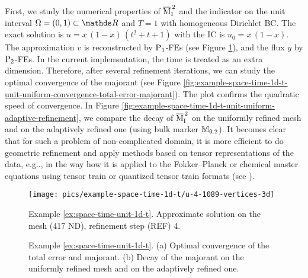 \begin{example}
\label{ex:space-time-unit-1d-t}

First, we study the numerical properties of $\overline{\mathrm M}^{\,2}_{\mathrm{I}}$ and the indicator on the unit 
interval $\Omega = (0, 1) \subset \Real$ and $T = 1$ with homogeneous Dirichlet BC.
The exact solution is $u = x\,(1 - x)\,(t^2 + t + 1)$ with the IC is
$u_0 = x\,(1 - x)$. The approximation $v$ is reconstructed by 
${\rm P}_{1}$-FEs (see Figure \ref{fig:example-space-time-shape-approx}), 
and the flux $y$ by ${\rm P}_{2}$-FEs. In the current implementation, the time is 
treated as an extra dimension. Therefore, after several refinement iterations, we 
can study the optimal convergence of the majorant 
(see Figure 
\ref{fig:example-space-time-1d-t-unit-uniform-convergence-total-error-majorant}). 
The plot confirms the quadratic speed of convergence. In Figure
\ref{fig:example-space-time-1d-t-unit-uniform-adaptive-refinement},
we compare the decay of $\overline{\mathrm M}^{\,2}_{\mathrm{I}}$ on the uniformly refined mesh and on the adaptively 
refined one (using bulk marker ${\mathbb M}_{0.2}$). It becomes clear that for such a 
problem 
of non-complicated domain, it is more efficient to do geometric refinement and 
apply methods based on tensor representations of the data, e.g.., in the way how it is 
applied to the Fokker--Planck or chemical master equations using tensor train or 
quantized tensor train formats 
(see \cite{DolgovKhoromskij2015, DolgovKhoromskijOseledets2012}).
\begin{figure}[!ht]
	\centering
	\texttt{[image: pics/example-space-time-1d-t/u-4-1089-vertices-3d]}
	\caption{Example \ref{ex:space-time-unit-1d-t}. 
	Approximate solution on the mesh (417 ND), refinement step (REF) 4.}	
	\label{fig:example-space-time-shape-approx}	
\end{figure}

\begin{figure}[!ht]
	\centering
	\caption{Example \ref{ex:space-time-unit-1d-t}.
	(a) Optimal convergence of the total error and majorant. (b) Decay of the
	majorant on the uniformly refined mesh and on the adaptively refined one.}
\end{figure}


\end{example}
